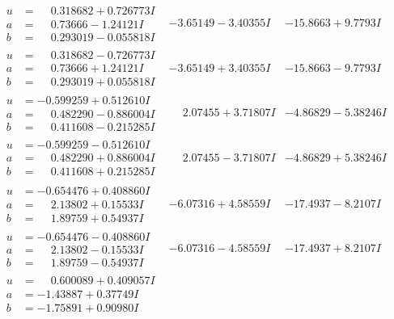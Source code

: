 \documentclass[1p]{elsarticle_modified}
\theoremstyle{definition}
\begin{document}
$$\begin{array}{c|c|c}
\begin{aligned}
u &= \phantom{-}0.318682 + 0.726773 I \\
a &= \phantom{-}0.73666 - 1.24121 I \\
b &= \phantom{-}0.293019 - 0.055818 I\end{aligned}
 & -3.65149 - 3.40355 I & -15.8663 + 9.7793 I \\ \hline\begin{aligned}
u &= \phantom{-}0.318682 - 0.726773 I \\
a &= \phantom{-}0.73666 + 1.24121 I \\
b &= \phantom{-}0.293019 + 0.055818 I\end{aligned}
 & -3.65149 + 3.40355 I & -15.8663 - 9.7793 I \\ \hline\begin{aligned}
u &= -0.599259 + 0.512610 I \\
a &= \phantom{-}0.482290 - 0.886004 I \\
b &= \phantom{-}0.411608 - 0.215285 I\end{aligned}
 & \phantom{-}2.07455 + 3.71807 I & -4.86829 - 5.38246 I \\ \hline\begin{aligned}
u &= -0.599259 - 0.512610 I \\
a &= \phantom{-}0.482290 + 0.886004 I \\
b &= \phantom{-}0.411608 + 0.215285 I\end{aligned}
 & \phantom{-}2.07455 - 3.71807 I & -4.86829 + 5.38246 I \\ \hline\begin{aligned}
u &= -0.654476 + 0.408860 I \\
a &= \phantom{-}2.13802 + 0.15533 I \\
b &= \phantom{-}1.89759 + 0.54937 I\end{aligned}
 & -6.07316 + 4.58559 I & -17.4937 - 8.2107 I \\ \hline\begin{aligned}
u &= -0.654476 - 0.408860 I \\
a &= \phantom{-}2.13802 - 0.15533 I \\
b &= \phantom{-}1.89759 - 0.54937 I\end{aligned}
 & -6.07316 - 4.58559 I & -17.4937 + 8.2107 I \\ \hline\begin{aligned}
u &= \phantom{-}0.600089 + 0.409057 I \\
a &= -1.43887 + 0.37749 I \\
b &= -1.75891 + 0.90980 I\end{aligned}

\end{array}$$
\end{document}
